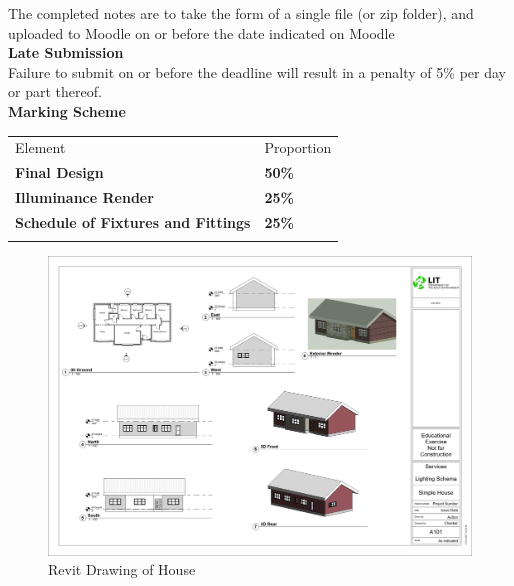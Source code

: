 The completed notes are to take the form of a single file (or zip folder), and uploaded to Moodle on or before the date indicated on Moodle\\

\newpage
\textbf{Late Submission}\\

Failure to submit on or before the deadline will result in a penalty of 5\% per day or part thereof.\\

\vspace{0.5cm}
\textbf{Marking Scheme}\\

\begin{table}[h!]
     \begin{center}
     \begin{tabular}{p{7cm}  p{3cm} }
     \toprule
      \textbf\large{Element} & \textbf\large{Proportion} \\ 
    \cmidrule(r){1-1}\cmidrule(lr){2-2}
      \textbf{Final Design} & \textbf{50\%}\\
      \textbf{Illuminance Render} & \textbf{25\%}\\    
      \textbf{Schedule of Fixtures and Fittings} & \textbf{25\%}\\    
      \\ \bottomrule
      \end{tabular}
      \label{tbl:markSchemeAsmt3}
      \end{center}
 \end{table}

\begin{figure}
	\centering
	\includegraphics[width=1.0\linewidth]{"../img/ID2-Lighting - Sheet - A101 - Simple House"}
	\caption[Revit Drawing of House]{Revit Drawing of House}
	\label{fig:id2-lighting---sheet---a101---simple-house}
\end{figure}





